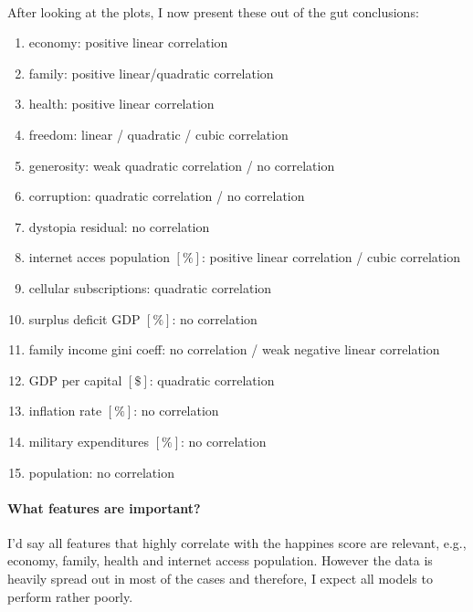 \documentclass[11pt]{article}
\begin{document}
    \begin{center}
    \end{center}
    { \hspace*{\fill} \\}
    
    \setlength{\parindent}{0in} After looking at the plots, I now present
these out of the gut conclusions:

\begin{enumerate}\itemsep-.3em
    \item economy: positive linear correlation
    \item family: positive linear/quadratic correlation
    \item health: positive linear correlation
    \item freedom: linear / quadratic / cubic correlation
    \item generosity: weak quadratic correlation / no correlation
    \item corruption: quadratic correlation / no correlation
    \item dystopia residual: no correlation
    \item internet acces population $\left[ \% \right]$: positive linear correlation / cubic correlation
    \item cellular subscriptions: quadratic correlation
    \item surplus deficit GDP $\left[ \% \right]$: no correlation
    \item family income gini coeff: no correlation / weak negative linear correlation
    \item GDP per capital $\left[ \$ \right]$: quadratic correlation
    \item inflation rate $\left[ \% \right]$: no correlation
    \item military expenditures $\left[ \% \right]$: no correlation
    \item population: no correlation
\end{enumerate}\paragraph{What features are important?}

I'd say all features that highly correlate with the happines score are
relevant, e.g., economy, family, health and internet access population.
However the data is heavily spread out in most of the cases and
therefore, I expect all models to perform rather poorly. \newpage
\end{document}
